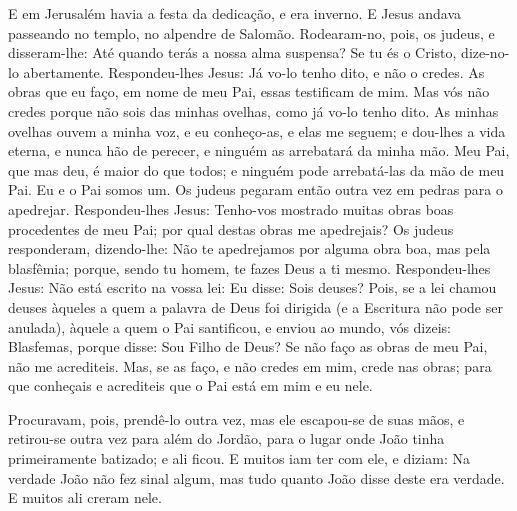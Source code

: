 E em Jerusalém havia a festa da dedicação, e era inverno.
E Jesus andava passeando no templo, no alpendre de Salomão.
Rodearam-no, pois, os judeus, e disseram-lhe: Até quando
terás a nossa alma suspensa? Se tu és o Cristo, dize-no-lo
abertamente. Respondeu-lhes Jesus: Já vo-lo tenho dito, e não
o credes. As obras que eu faço, em nome de meu Pai, essas testificam
de mim. Mas vós não credes porque não sois das minhas
ovelhas, como já vo-lo tenho dito. As minhas ovelhas ouvem a
minha voz, e eu conheço-as, e elas me seguem; e dou-lhes a
vida eterna, e nunca hão de perecer, e ninguém as arrebatará da
minha mão. Meu Pai, que mas deu, é maior do que todos; e
ninguém pode arrebatá-las da mão de meu Pai. Eu e o Pai somos
um. Os judeus pegaram então outra vez em pedras para o
apedrejar. Respondeu-lhes Jesus: Tenho-vos mostrado muitas
obras boas procedentes de meu Pai; por qual destas obras me
apedrejais? Os judeus responderam, dizendo-lhe: Não te
apedrejamos por alguma obra boa, mas pela blasfêmia; porque, sendo
tu homem, te fazes Deus a ti mesmo. Respondeu-lhes Jesus: Não
está escrito na vossa lei: Eu disse: Sois deuses? Pois, se a
lei chamou deuses àqueles a quem a palavra de Deus foi dirigida (e a
Escritura não pode ser anulada), àquele a quem o Pai
santificou, e enviou ao mundo, vós dizeis: Blasfemas, porque disse:
Sou Filho de Deus? Se não faço as obras de meu Pai, não me
acrediteis. Mas, se as faço, e não credes em mim, crede nas
obras; para que conheçais e acrediteis que o Pai está em mim e eu
nele.

Procuravam, pois, prendê-lo outra vez, mas ele escapou-se de suas
mãos, e retirou-se outra vez para além do Jordão, para o
lugar onde João tinha primeiramente batizado; e ali ficou. E
muitos iam ter com ele, e diziam: Na verdade João não fez sinal
algum, mas tudo quanto João disse deste era verdade. E muitos
ali creram nele.

\medskip

